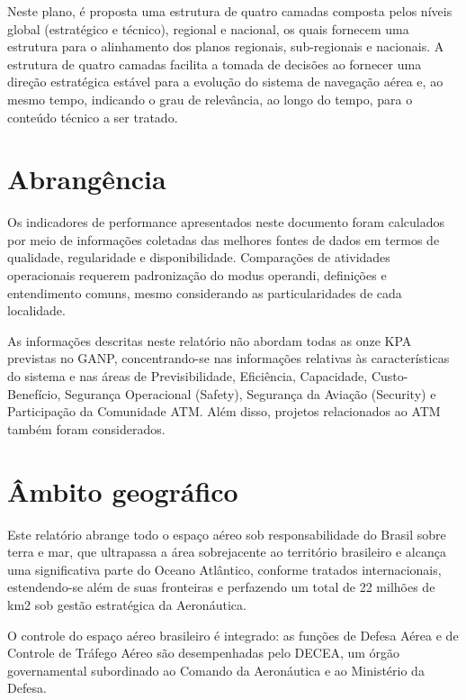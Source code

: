 \documentclass[
]{book}
\theoremstyle{definition}
\theoremstyle{definition}
\theoremstyle{definition}
\theoremstyle{definition}
\theoremstyle{remark}
\begin{document}
Neste plano, é proposta uma estrutura de quatro camadas composta pelos níveis global (estratégico e técnico), regional e nacional, os quais fornecem uma estrutura para o alinhamento dos planos regionais, sub-regionais e nacionais. A estrutura de quatro camadas facilita a tomada de decisões ao fornecer uma direção estratégica estável para a evolução do sistema de navegação aérea e, ao mesmo tempo, indicando o grau de relevância, ao longo do tempo, para o conteúdo técnico a ser tratado.

\hypertarget{abranguxeancia}{%
\section{Abrangência}\label{abranguxeancia}}

Os indicadores de performance apresentados neste documento foram calculados por meio de informações coletadas das melhores fontes de dados em termos de qualidade, regularidade e disponibilidade. Comparações de atividades operacionais requerem padronização do modus operandi, definições e entendimento comuns, mesmo considerando as particularidades de cada localidade.

As informações descritas neste relatório não abordam todas as onze KPA previstas no GANP, concentrando-se nas informações relativas às características do sistema e nas áreas de Previsibilidade, Eficiência, Capacidade, Custo-Benefício, Segurança Operacional (Safety), Segurança da Aviação (Security) e Participação da Comunidade ATM. Além disso, projetos relacionados ao ATM também foram considerados.

\hypertarget{uxe2mbito-geogruxe1fico}{%
\section{Âmbito geográfico}\label{uxe2mbito-geogruxe1fico}}

Este relatório abrange todo o espaço aéreo sob responsabilidade do Brasil sobre terra e mar, que ultrapassa a área sobrejacente ao território brasileiro e alcança uma significativa parte do Oceano Atlântico, conforme tratados internacionais, estendendo-se além de suas fronteiras e perfazendo um total de 22 milhões de km2 sob gestão estratégica da Aeronáutica.

O controle do espaço aéreo brasileiro é integrado: as funções de Defesa Aérea e de Controle de Tráfego Aéreo são desempenhadas pelo DECEA, um órgão governamental subordinado ao Comando da Aeronáutica e ao Ministério da Defesa.
\end{document}
